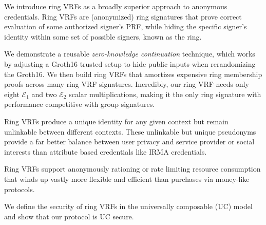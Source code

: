 
\def\eprintsmallskip{\smallskip}{}%
We introduce ring VRFs as a broadly superior approach to anonymous credentials.
Ring VRFs are (anonymized) ring signatures that prove correct evaluation
of some authorized signer's PRF, while hiding the specific signer's
identity within some set of possible signers, known as the ring.

\eprintsmallskip
We demonstrate a reusable {\em zero-knowledge continuation} technique,
which works by adjusting a Groth16 trusted setup to hide public inputs
when rerandomizing the Groth16.  We then build ring VRFs that amortizes
expensive ring membership proofs across many ring VRF signatures.
%
Incredibly, our ring VRF needs only eight $\mathcal{E}_1$ and two
$\mathcal{E}_2$ scalar multiplications, making it the only ring signature
with performance competitive with group signatures.

\eprintsmallskip
Ring VRFs produce a unique identity for any given context but remain
unlinkable between different contexts.  These unlinkable but unique
pseudonyms provide a far better balance between user privacy and service
provider or social interests than attribute based credentials like IRMA credentials.

\eprintsmallskip
Ring VRFs support anonymously rationing or rate limiting resource
consumption that winds up vastly more flexible and efficient than
purchases via money-like protocols.

\eprintsmallskip
We define the security of ring VRFs in the universally composable (UC) model and show that our protocol is UC secure.

